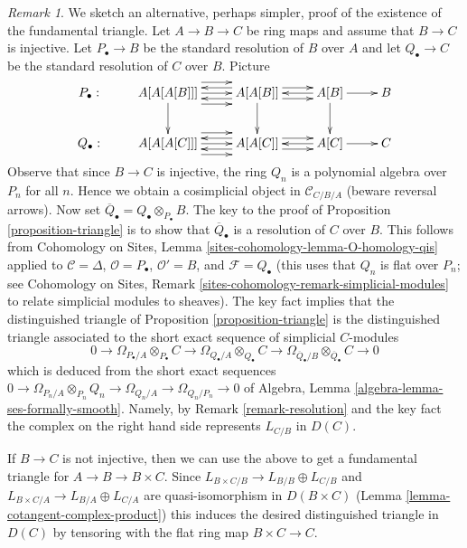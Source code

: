 \documentclass{stacks-project}
\theoremstyle{plain}
\theoremstyle{definition}
\theoremstyle{remark}
\newtheorem{remark}[subsection]{Remark}
\numberwithin{equation}{subsection}
\begin{document}
\begin{remark}
\label{remark-triangle}
We sketch an alternative, perhaps simpler, proof of the existence of
the fundamental triangle.
Let $A \to B \to C$ be ring maps and assume that $B \to C$ is injective.
Let $P_\bullet \to B$ be the standard resolution of $B$ over $A$ and
let $Q_\bullet \to C$ be the standard resolution of $C$ over $B$.
Picture
$$
\xymatrix{
P_\bullet : &
A[A[A[B]]] \ar[d]
\ar@<2ex>[r]
\ar@<0ex>[r]
\ar@<-2ex>[r]
&
A[A[B]] \ar[d]
\ar@<1ex>[r]
\ar@<-1ex>[r]
\ar@<1ex>[l]
\ar@<-1ex>[l]
&
A[B] \ar[d] \ar@<0ex>[l] \ar[r] &
B \\
Q_\bullet : &
A[A[A[C]]]
\ar@<2ex>[r]
\ar@<0ex>[r]
\ar@<-2ex>[r]
&
A[A[C]]
\ar@<1ex>[r]
\ar@<-1ex>[r]
\ar@<1ex>[l]
\ar@<-1ex>[l]
&
A[C] \ar@<0ex>[l] \ar[r] &
C
}
$$
Observe that since $B \to C$ is injective, the ring $Q_n$ is a
polynomial algebra over $P_n$ for all $n$. Hence we obtain a cosimplicial
object in $\mathcal{C}_{C/B/A}$ (beware reversal arrows).
Now set $\overline{Q}_\bullet = Q_\bullet \otimes_{P_\bullet} B$.
The key to the proof of Proposition \ref{proposition-triangle}
is to show that $\overline{Q}_\bullet$ is a resolution of $C$ over $B$.
This follows from Cohomology on Sites, Lemma
\ref{sites-cohomology-lemma-O-homology-qis}
applied to $\mathcal{C} = \Delta$, $\mathcal{O} = P_\bullet$,
$\mathcal{O}' = B$, and $\mathcal{F} = Q_\bullet$ (this uses that $Q_n$
is flat over $P_n$; see Cohomology on Sites, Remark
\ref{sites-cohomology-remark-simplicial-modules} to relate simplicial modules
to sheaves). The key fact implies that the distinguished triangle of
Proposition \ref{proposition-triangle}
is the distinguished triangle associated to the short exact sequence
of simplicial $C$-modules
$$
0 \to
\Omega_{P_\bullet/A} \otimes_{P_\bullet} C \to
\Omega_{Q_\bullet/A} \otimes_{Q_\bullet} C \to
\Omega_{\overline{Q}_\bullet/B} \otimes_{\overline{Q}_\bullet} C \to 0
$$
which is deduced from the short exact sequences
$0 \to \Omega_{P_n/A} \otimes_{P_n} Q_n \to \Omega_{Q_n/A} \to
\Omega_{Q_n/P_n} \to 0$ of
Algebra, Lemma \ref{algebra-lemma-ses-formally-smooth}.
Namely, by Remark \ref{remark-resolution} and the key fact the complex on the
right hand side represents $L_{C/B}$ in $D(C)$.

\medskip\noindent
If $B \to C$ is not injective, then we can use the above to get a
fundamental triangle for $A \to B \to B \times C$. Since
$L_{B \times C/B} \to L_{B/B} \oplus L_{C/B}$ and
$L_{B \times C/A} \to L_{B/A} \oplus L_{C/A}$
are quasi-isomorphism in $D(B \times C)$
(Lemma \ref{lemma-cotangent-complex-product})
this induces the desired distinguished triangle in $D(C)$
by tensoring with the flat ring map $B \times C \to C$.
\end{remark}
\end{document}
